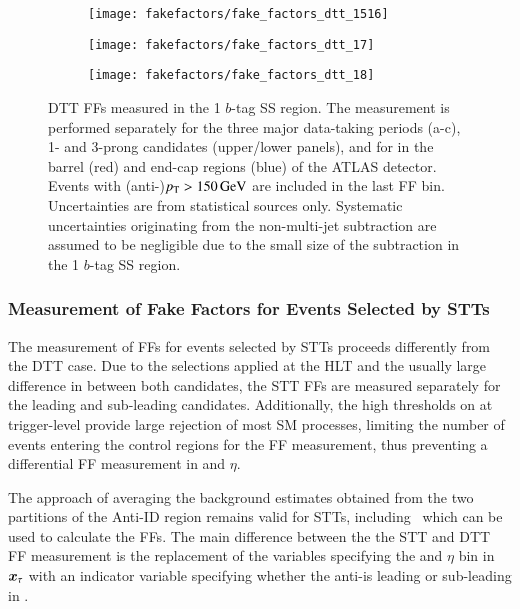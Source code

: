 \begin{figure}[htbp]
  \centering

  \begin{subfigure}{0.495\textwidth}
    \texttt{[image: fakefactors/fake\_factors\_dtt\_1516]}
  \end{subfigure}
  \begin{subfigure}{0.495\textwidth}
    \texttt{[image: fakefactors/fake\_factors\_dtt\_17]}
  \end{subfigure}

  \begin{subfigure}{0.495\textwidth}
    \texttt{[image: fakefactors/fake\_factors\_dtt\_18]}
  \end{subfigure}

  \caption{DTT FFs measured in the 1 $b$-tag SS region. The measurement is
    performed separately for the three major data-taking periods (a-c), 1- and
    3-prong \tauhadvis candidates (upper/lower panels), and for \tauhadvis in
    the barrel (red) and end-cap regions (blue) of the ATLAS detector. Events
    with (anti-)\tauhadvis $p_{\text{T}} > \SI{150}{\ensuremath{\text{GeV}}}$ are included in the last FF
    bin. Uncertainties are from statistical sources only. Systematic
    uncertainties originating from the non-multi-jet subtraction are assumed to
    be negligible due to the small size of the subtraction in the 1 $b$-tag SS
    region.}%
  \label{fig:mjfakes_fake_factors}
\end{figure}


\subsubsection{Measurement of Fake Factors for Events Selected by STTs}

The measurement of FFs for events selected by STTs proceeds differently from the
DTT case. Due to the selections applied at the HLT and the usually large
difference in \pT between both \tauhadvis candidates, the STT FFs are measured
separately for the leading and sub-leading \tauhadvis candidates. Additionally,
the high \pT thresholds on \tauhadvis at trigger-level provide large rejection
of most SM processes, limiting the number of events entering the control regions
for the FF measurement, thus preventing a differential FF measurement in
\tauhadvis \pT and $\eta$.

The approach of averaging the background estimates obtained from the two
partitions of the Anti-ID region remains valid for STTs,
including~ which can be used to calculate the
FFs. The main difference between the the STT and DTT FF measurement is the
replacement of the variables specifying the \pT and $\eta$ bin in
$\bm{x}_\tau$ with an indicator variable specifying whether the
anti-\tauhadvis is leading or sub-leading in \pT.

